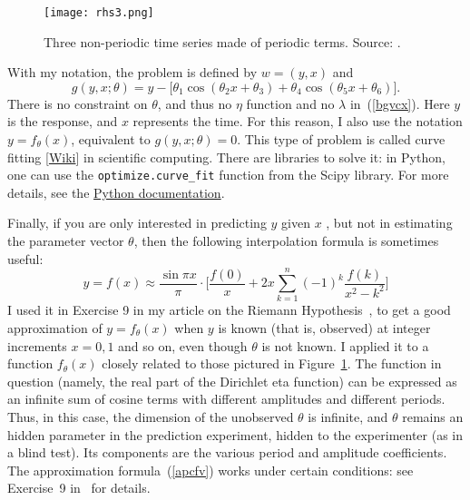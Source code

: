 \documentclass[oneside,10pt]{book}
\begin{document}
\begin{figure}[H]
\centering
\texttt{[image: rhs3.png]}
\caption{Three non-periodic time series made of periodic terms. Source: \cite{vggrh2022}.}
\label{fig:rhs3v2}
\end{figure}


With my notation, the problem is
 defined by $w=(y,x)$ and
 \begin{equation}
g(y,x;\theta)= y - \Big[\theta_1 \cos(\theta_2 x + \theta_3) + \theta_4\cos (\theta_5 x + \theta_6)\Big]. \label{rtfer}
\end{equation}
There is no constraint on $\theta$, and thus no $\eta$ function and no $\lambda$ in~(\ref{bgvcx}). Here $y$ is the response, and $x$ represents the time. For this reason, I also use the notation $y=f_\theta(x)$, equivalent to $g(y,x;\theta)=0$. This type of problem is called \textcolor{index}{curve fitting}
 [\href{https://en.wikipedia.org/wiki/Curve_fitting}{Wiki}] in scientific computing. There are libraries to solve it: in Python,
 one can use the \texttt{optimize.curve\_fit} function from the Scipy library. For more details, see the
 \href{https://docs.scipy.org/doc/scipy/reference/generated/scipy.optimize.curve_fit.html}{Python documentation}.



Finally, if you are only interested in predicting $y$ given $x$ , but not in estimating the parameter vector $\theta$, then the following interpolation formula
is sometimes useful:
\begin{equation}
y=f(x)\approx \frac{\sin\pi x}{\pi}\cdot \Bigg[ \frac{f(0)}{x} + 2x\sum_{k=1}^n (-1)^k \frac{f(k)}{x^2-k^2}\Bigg] \label{apcfv}
\end{equation}
I used it in Exercise 9 in my article on the Riemann Hypothesis~\cite{vggrh2022}, to get a good approximation of $y=f_\theta(x)$ when $y$ is known (that is, observed) at
integer increments $x=0,1$ and so on, even though $\theta$ is not known. I applied it to a function $f_\theta(x)$ closely related
to those pictured in Figure~\ref{fig:rhs3v2}. The function in question (namely, the real part of the Dirichlet eta function) can be expressed as an infinite sum of cosine terms with different amplitudes and different periods.
 Thus, in this case, the dimension of the unobserved $\theta$ is infinite, and $\theta$ remains an hidden parameter in the prediction experiment, hidden to the experimenter (as in a blind test). Its components are the various period and amplitude coefficients.
 The approximation formula~(\ref{apcfv}) works under certain conditions: see Exercise~9 in~\cite{vggrh2022} for details.
\end{document}
